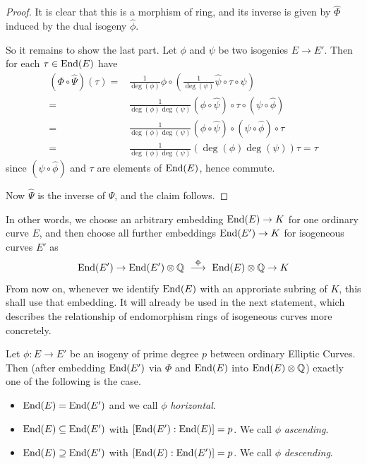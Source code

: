 \begin{proof}
    It is clear that this is a morphism of ring, and its inverse is given by $\hat{\Phi}$ induced by the dual isogeny $\hat{\phi}$.
    
    So it remains to show the last part.
    Let $\phi$ and $\psi$ be two isogenies $E \to E'$.
    Then for each $\tau \in \mathrm{End}(E)$ have
    \begin{align*}
        (\Phi \circ \hat{\Psi})(\tau) =& \frac 1 { \deg(\phi) } \phi \circ \left( \frac 1 {\deg(\psi)} \hat{\psi} \circ \tau \circ \psi \right) \\
        =& \frac 1 { \deg(\phi)\deg(\psi) } (\phi \circ \hat{\psi}) \circ \tau \circ (\psi \circ \hat{\phi}) \\
        =& \frac 1 { \deg(\phi)\deg(\psi) } (\phi \circ \hat{\psi}) \circ (\psi \circ \hat{\phi}) \circ \tau \\
        =& \frac 1 { \deg(\phi)\deg(\psi) } (\deg(\phi) \deg(\psi)) \tau = \tau
    \end{align*}
    since $(\psi \circ \hat{\phi})$ and $\tau$ are elements of $\mathrm{End}(E)$, hence commute.

    Now $\hat{\Psi}$ is the inverse of $\Psi$, and the claim follows.
\end{proof}
In other words, we choose an arbitrary embedding $\mathrm{End}(E) \to K$ for one ordinary curve $E$, and then choose all further embeddings $\mathrm{End}(E') \to K$ for isogeneous curves $E'$ as
\begin{equation*}
    \End(E') \to \End(E') \otimes \Q \ \overset{\Phi}{\longrightarrow} \ \End(E) \otimes \Q \to K
\end{equation*}
From now on, whenever we identify $\mathrm{End}(E)$ with an approriate subring of $K$, this shall use that embedding.
It will already be used in the next statement, which describes the relationship of endomorphism rings of isogeneous curves more concretely.
\begin{prop}
    Let $\phi: E \to E'$ be an isogeny of prime degree $p$ between ordinary Elliptic Curves.
    Then (after embedding $\mathrm{End}(E')$ via $\Phi$ and $\mathrm{End}(E)$ into $\mathrm{End}(E) \otimes \mathbb{Q}$) exactly one of the following is the case.
    \begin{itemize}
        \item $\mathrm{End}(E) = \mathrm{End}(E')$ and we call $\phi$ \emph{horizontal}.
        \item $\mathrm{End}(E) \subseteq \mathrm{End}(E')$ with $[\mathrm{End}(E') : \mathrm{End}(E)] = p$. We call $\phi$ \emph{ascending}.
        \item $\mathrm{End}(E) \supseteq \mathrm{End}(E')$ with $[\mathrm{End}(E) : \mathrm{End}(E')] = p$. We call $\phi$ \emph{descending}.
    \end{itemize}
\end{prop}
